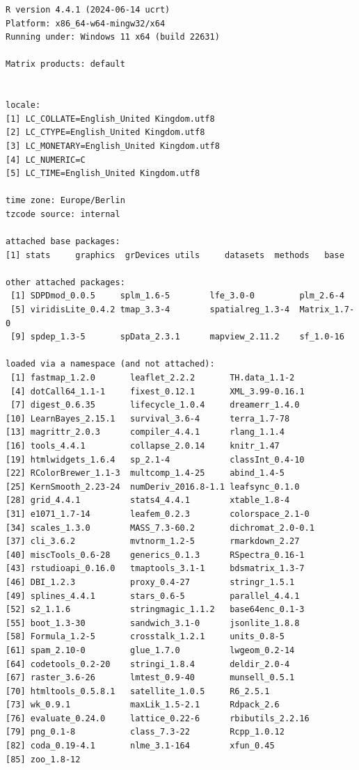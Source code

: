 \documentclass[
  letterpaper,
]{scrbook}
\begin{document}
\begin{verbatim}
R version 4.4.1 (2024-06-14 ucrt)
Platform: x86_64-w64-mingw32/x64
Running under: Windows 11 x64 (build 22631)

Matrix products: default


locale:
[1] LC_COLLATE=English_United Kingdom.utf8 
[2] LC_CTYPE=English_United Kingdom.utf8   
[3] LC_MONETARY=English_United Kingdom.utf8
[4] LC_NUMERIC=C                           
[5] LC_TIME=English_United Kingdom.utf8    

time zone: Europe/Berlin
tzcode source: internal

attached base packages:
[1] stats     graphics  grDevices utils     datasets  methods   base     

other attached packages:
 [1] SDPDmod_0.0.5     splm_1.6-5        lfe_3.0-0         plm_2.6-4        
 [5] viridisLite_0.4.2 tmap_3.3-4        spatialreg_1.3-4  Matrix_1.7-0     
 [9] spdep_1.3-5       spData_2.3.1      mapview_2.11.2    sf_1.0-16        

loaded via a namespace (and not attached):
 [1] fastmap_1.2.0       leaflet_2.2.2       TH.data_1.1-2      
 [4] dotCall64_1.1-1     fixest_0.12.1       XML_3.99-0.16.1    
 [7] digest_0.6.35       lifecycle_1.0.4     dreamerr_1.4.0     
[10] LearnBayes_2.15.1   survival_3.6-4      terra_1.7-78       
[13] magrittr_2.0.3      compiler_4.4.1      rlang_1.1.4        
[16] tools_4.4.1         collapse_2.0.14     knitr_1.47         
[19] htmlwidgets_1.6.4   sp_2.1-4            classInt_0.4-10    
[22] RColorBrewer_1.1-3  multcomp_1.4-25     abind_1.4-5        
[25] KernSmooth_2.23-24  numDeriv_2016.8-1.1 leafsync_0.1.0     
[28] grid_4.4.1          stats4_4.4.1        xtable_1.8-4       
[31] e1071_1.7-14        leafem_0.2.3        colorspace_2.1-0   
[34] scales_1.3.0        MASS_7.3-60.2       dichromat_2.0-0.1  
[37] cli_3.6.2           mvtnorm_1.2-5       rmarkdown_2.27     
[40] miscTools_0.6-28    generics_0.1.3      RSpectra_0.16-1    
[43] rstudioapi_0.16.0   tmaptools_3.1-1     bdsmatrix_1.3-7    
[46] DBI_1.2.3           proxy_0.4-27        stringr_1.5.1      
[49] splines_4.4.1       stars_0.6-5         parallel_4.4.1     
[52] s2_1.1.6            stringmagic_1.1.2   base64enc_0.1-3    
[55] boot_1.3-30         sandwich_3.1-0      jsonlite_1.8.8     
[58] Formula_1.2-5       crosstalk_1.2.1     units_0.8-5        
[61] spam_2.10-0         glue_1.7.0          lwgeom_0.2-14      
[64] codetools_0.2-20    stringi_1.8.4       deldir_2.0-4       
[67] raster_3.6-26       lmtest_0.9-40       munsell_0.5.1      
[70] htmltools_0.5.8.1   satellite_1.0.5     R6_2.5.1           
[73] wk_0.9.1            maxLik_1.5-2.1      Rdpack_2.6         
[76] evaluate_0.24.0     lattice_0.22-6      rbibutils_2.2.16   
[79] png_0.1-8           class_7.3-22        Rcpp_1.0.12        
[82] coda_0.19-4.1       nlme_3.1-164        xfun_0.45          
[85] zoo_1.8-12         
\end{verbatim}
\end{document}
